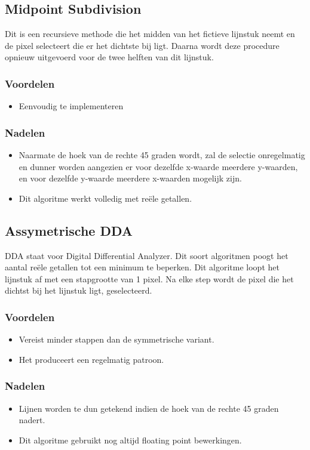 \documentclass{report}
\begin{document}
	\subsection{Midpoint Subdivision}
	Dit is een recursieve methode die het midden van het fictieve lijnstuk neemt en de pixel selecteert die er het dichtste bij ligt. Daarna wordt deze procedure opnieuw uitgevoerd voor de twee helften van dit lijnstuk.
	
	\subsubsection{Voordelen}
	\begin{itemize}
		\item Eenvoudig te implementeren
	\end{itemize}
	\subsubsection{Nadelen}
	\begin{itemize}
		\item Naarmate de hoek van de rechte 45 graden wordt, zal de selectie onregelmatig en dunner worden aangezien er voor dezelfde x-waarde meerdere y-waarden, en voor dezelfde y-waarde meerdere x-waarden mogelijk zijn.
		\item Dit algoritme werkt volledig met reële getallen.
	\end{itemize}
	
	\subsection{Assymetrische DDA}
	DDA staat voor Digital Differential Analyzer. Dit soort algoritmen poogt het aantal reële getallen tot een minimum te beperken.
	Dit algoritme loopt het lijnstuk af met een stapgrootte van 1 pixel. Na elke step wordt de pixel die het dichtst bij het lijnstuk ligt, geselecteerd.
	\subsubsection{Voordelen}
	\begin{itemize}
		\item Vereist minder stappen dan de symmetrische variant.
		\item Het produceert een regelmatig patroon.
	\end{itemize}
	\subsubsection{Nadelen}
	\begin{itemize}
		\item Lijnen worden te dun getekend indien de hoek van de rechte 45 graden nadert.
		\item Dit algoritme gebruikt nog altijd floating point bewerkingen.
	\end{itemize}
\end{document}
